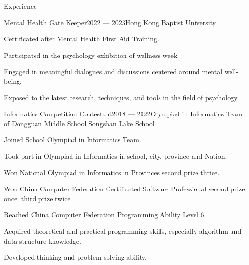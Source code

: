 \documentclass[
	11pt, %
]{resume} %
\begin{document}
\begin{rSection}{Experience}
    \begin{rSubsection}{Mental Health Gate Keeper}{2022 --- 2023}{Hong Kong Baptist University}{}
        \item Certificated after Mental Health First Aid Training.
        \item Participated in the psychology exhibition of wellness week.
        \item Engaged in meaningful dialogues and discussions centered around mental well-being.
        \item Exposed to the latest research, techniques, and tools in the field of psychology.
    \end{rSubsection}


    \begin{rSubsection}{Informatics Competition Contestant}{2018 --- 2022}{Olympiad in Informatics Team of Dongguan Middle School Songshan Lake School}{}
        \item Joined School Olympiad in Informatics Team.
        \item Took part in Olympiad in Informatics in school, city, province and Nation.
        \item Won National Olympiad in Informatics in Provinces second prize thrice.
        \item Won China Computer Federation Certificated Software Professional second prize once, third prize twice.
        \item Reached China Computer Federation Programming Ability Level 6.
        \item Acquired theoretical and practical programming skills, especially algorithm and data structure knowledge.
        \item Developed thinking and problem-solving ability,
    \end{rSubsection}

\end{rSection}
\end{document}
